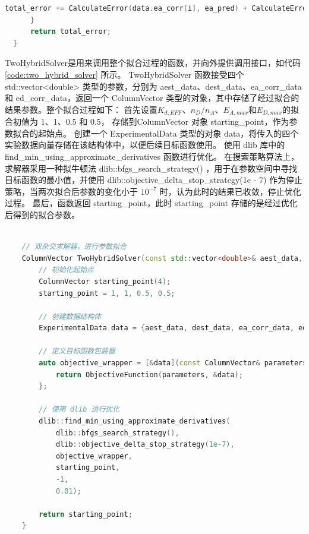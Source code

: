 \begin{enumerate}
\begin{lstlisting}[language=C++, caption={误差计算函数}, label={code:error_calculate}]
          total_error += CalculateError(data.ea_corr[i], ea_pred) + CalculateError(data.ed_corr[i], ed_pred);
      }
      return total_error;
  }
  \end{lstlisting}
  TwoHybridSolver是用来调用整个拟合过程的函数，并向外提供调用接口，如代码 \ref{code:two_hybrid_solver} 所示。
  {TwoHybridSolver} 函数接受四个 std::vector<double> 类型的参数，分别为 {aest\_data}、{dest\_data}、{ea\_corr\_data} 和 {ed\_corr\_data}，返回一个 {ColumnVector} 类型的对象，其中存储了经过拟合的结果参数。整个拟合过程如下：
  首先设置$K_{d,EFF}$、$n_D/n_A$、$E_{A,max}$和$E_{D,max}$的拟合初值为 1、1、0.5 和 0.5， 存储到{ColumnVector} 对象 {starting\_point}，作为参数拟合的起始点。
  创建一个 {ExperimentalData} 类型的对象 {data}，将传入的四个实验数据向量存储在该结构体中，以便后续目标函数使用。
  使用 {dlib} 库中的 {find\_min\_using\_approximate\_derivatives} 函数进行优化。
  在搜索策略算法上，求解器采用一种拟牛顿法 {dlib::bfgs\_search\_strategy()} ，用于在参数空间中寻找目标函数的最小值，并使用 {dlib::objective\_delta\_stop\_strategy(1e - 7)} 作为停止策略，当两次拟合后参数的变化小于 $10^{-7}$ 时，认为此时的结果已收敛，停止优化过程。
  最后，函数返回 {starting\_point}，此时 {starting\_point} 存储的是经过优化后得到的拟合参数。
  \begin{lstlisting}[language=C++, caption={双杂交求解器}, label={code:two_hybrid_solver}]
    
    // 双杂交求解器，进行参数拟合
    ColumnVector TwoHybridSolver(const std::vector<double>& aest_data, const std::vector<double>& dest_data, const std::vector<double>& ea_corr_data,const std::vector<double>& ed_corr_data) {
        // 初始化起始点
        ColumnVector starting_point(4);
        starting_point = 1, 1, 0.5, 0.5;
    
        // 创建数据结构体
        ExperimentalData data = {aest_data, dest_data, ea_corr_data, ed_corr_data};
    
        // 定义目标函数包装器
        auto objective_wrapper = [&data](const ColumnVector& parameters) {
            return ObjectiveFunction(parameters, &data);
        };
    
        // 使用 dlib 进行优化
        dlib::find_min_using_approximate_derivatives(
            dlib::bfgs_search_strategy(),
            dlib::objective_delta_stop_strategy(1e-7),
            objective_wrapper,
            starting_point,
            -1,
            0.01);
  
        return starting_point;
    }
    \end{lstlisting}  
\end{enumerate}

